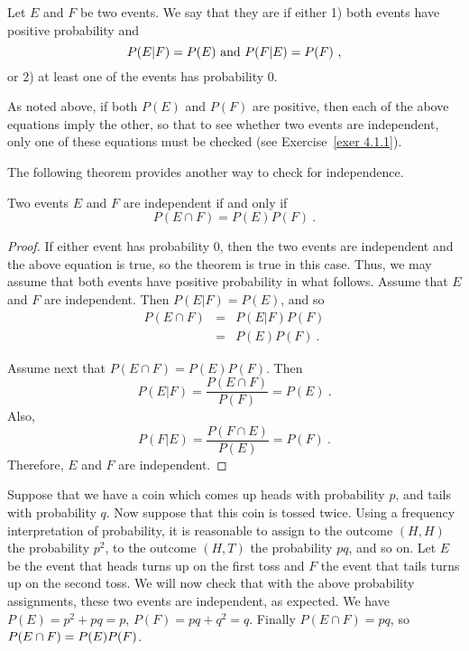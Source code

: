 \begin{definition}\label{def 4.1}
\leanok
Let $E$ and $F$ be two events.  We say that they are  if either 1) both events have positive probability and
$$
P(E|F) = P(E)\ {\rm and}\ P(F|E) = P(F)\ ,
$$
or 2) at least one of the events has probability 0.
\end{definition}

As noted above, if both $P(E)$ and $P(F)$ are positive, then each of the above equations
imply the other, so that to see whether two events are independent, only one of these
equations must be checked (see Exercise~\ref{exer 4.1.1}).
\par
The following theorem provides another way to check for independence.

\begin{theorem}\label{thm 4.1}
Two events $E$ and $F$ are independent if and only if 
$$P(E\cap F) = P(E)P(F)\ .$$
\end{theorem}
\begin{proof}
	If either event has probability 0, then the two events are independent and the above equation 
	is true, so the theorem is true in this case.  Thus, we may assume that both events have positive 
	probability in what follows. Assume that $E$ and $F$ are independent.  Then $P(E|F) = P(E)$, and so
	\begin{eqnarray*}
		P(E\cap F) & = & P(E|F)P(F) \\
		& = & P(E)P(F)\ .
	\end{eqnarray*}
	
	Assume next that $P(E\cap F) = P(E)P(F)$.  Then
	$$
	P(E|F) = \frac {P(E \cap F)}{P(F)} = P(E)\ .
	$$
	Also,
	$$
	P(F|E) = \frac {P(F \cap E)}{P(E)} = P(F)\ .
	$$
	Therefore, $E$ and $F$ are independent.
\end{proof}

\begin{example}\label{exam 4.6}
Suppose that we have a coin which comes up heads with probability $p$, and tails with probability
$q$.  Now suppose that this coin is tossed twice.  Using a frequency interpretation of probability, it is reasonable to assign to the
outcome $(H,H)$ the probability $p^2$, to the outcome $(H, T)$ the probability $pq$, and so on.  
Let $E$ be the event that heads turns up on the first toss and $F$ the event that tails turns up on
the second toss.  We will now check that with the above probability assignments, these two events are
independent, as expected.  We have $P(E) = p^2 + pq = p$, $P(F) = pq + q^2 = q$.  Finally $P(E\cap
F) = pq$, so $P(E\cap F) = \linebreak[4] P(E)P(F)$.  
\end{example}

